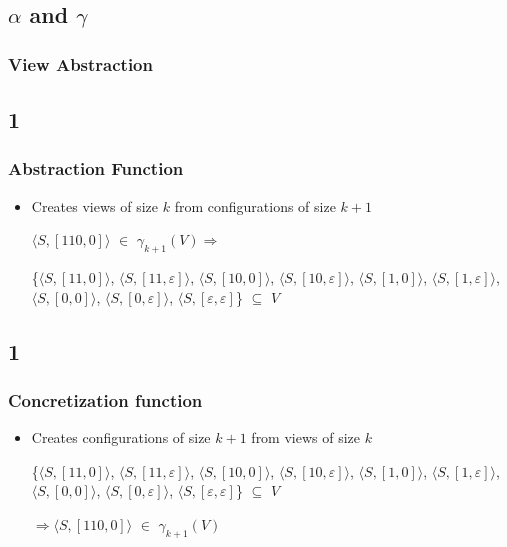 \documentclass[handout]{beamer}
\begin{document}
\subsection{$\alpha$ and $\gamma$}
\begin{frame}
  \frametitle{View Abstraction} %
  \begin{exampleblock}{}
    \abstraction
  \end{exampleblock}
\end{frame}

\subsection*{1}
\begin{frame}
  \frametitle{Abstraction Function}
  \begin{itemize}
  \item
    Creates views of size $k$ from configurations of size $k+1$

    \begin{example}[$\alpha$ for ABP with $k=2$]

    $\langle S, [110,0]\rangle$ $\in$ $\gamma_{k+1}(V) \Rightarrow$ 
   
    \{$\langle S, [11, 0]\rangle$, $\langle S, [11, \varepsilon]\rangle$, $\langle S, [10, 0]\rangle$, $\langle S, [10, \varepsilon]\rangle$, $\langle S, [1, 0]\rangle$, $\langle S, [1,\varepsilon ]\rangle$, $\langle S,[0,0]\rangle$, $\langle S, [0,\varepsilon]\rangle$, $\langle S, [\varepsilon, \varepsilon]$\} $\subseteq$ $V$

    \end{example}
  \end{itemize}
\end{frame}

\subsection*{1}
\begin{frame}
  \frametitle{Concretization function}
  \begin{itemize}
  \item
    Creates configurations of size $k+1$ from views of size $k$

    \begin{example}[$\gamma$ for ABP with $k=2$]
    
 
    \{$\langle S, [11, 0]\rangle$, $\langle S, [11, \varepsilon]\rangle$, $\langle S, [10, 0]\rangle$, $\langle S, [10, \varepsilon]\rangle$, $\langle S, [1, 0]\rangle$, $\langle S, [1,\varepsilon ]\rangle$, $\langle S,[0,0]\rangle$, $\langle S, [0,\varepsilon]\rangle$, $\langle S, [\varepsilon, \varepsilon]$\} $\subseteq$ $V$

    $\Rightarrow \langle S, [110,0]\rangle$ $\in$ $\gamma_{k+1}(V)$ 


    \end{example}
  \end{itemize}
\end{frame}
\end{document}
